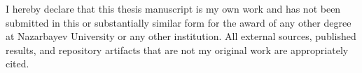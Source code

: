 I hereby declare that this thesis manuscript is my own work and has not been submitted in this or substantially similar form for the award of any other degree at Nazarbayev University or any other institution. All external sources, published results, and repository artifacts that are not my original work are appropriately cited.
